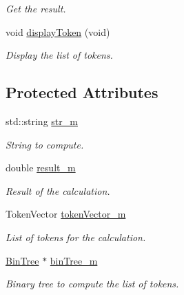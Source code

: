 \begin{DoxyCompactItemize}
\begin{DoxyCompactList}\small\item\em Get the result. \end{DoxyCompactList}\item 
\hypertarget{class_analyze_a9e9e81737e81f2cef3d3d3888370a845}{void \hyperlink{class_analyze_a9e9e81737e81f2cef3d3d3888370a845}{display\-Token} (void)}\label{class_analyze_a9e9e81737e81f2cef3d3d3888370a845}

\begin{DoxyCompactList}\small\item\em Display the list of tokens. \end{DoxyCompactList}\end{DoxyCompactItemize}
\subsection*{Protected Attributes}
\begin{DoxyCompactItemize}
\item 
\hypertarget{class_analyze_a5eaf2648206b44a7136f00f6f2aea716}{std\-::string \hyperlink{class_analyze_a5eaf2648206b44a7136f00f6f2aea716}{str\-\_\-m}}\label{class_analyze_a5eaf2648206b44a7136f00f6f2aea716}

\begin{DoxyCompactList}\small\item\em String to compute. \end{DoxyCompactList}\item 
\hypertarget{class_analyze_ac5e2e04f7a6530205899bfc8089e6a1b}{double \hyperlink{class_analyze_ac5e2e04f7a6530205899bfc8089e6a1b}{result\-\_\-m}}\label{class_analyze_ac5e2e04f7a6530205899bfc8089e6a1b}

\begin{DoxyCompactList}\small\item\em Result of the calculation. \end{DoxyCompactList}\item 
\hypertarget{class_analyze_a0cb9f60bf517b50df90aa9669199f61c}{Token\-Vector \hyperlink{class_analyze_a0cb9f60bf517b50df90aa9669199f61c}{token\-Vector\-\_\-m}}\label{class_analyze_a0cb9f60bf517b50df90aa9669199f61c}

\begin{DoxyCompactList}\small\item\em List of tokens for the calculation. \end{DoxyCompactList}\item 
\hypertarget{class_analyze_a39e0800126b89524cad70e84b5bb3704}{\hyperlink{class_bin_tree}{Bin\-Tree} $\ast$ \hyperlink{class_analyze_a39e0800126b89524cad70e84b5bb3704}{bin\-Tree\-\_\-m}}\label{class_analyze_a39e0800126b89524cad70e84b5bb3704}

\begin{DoxyCompactList}\small\item\em Binary tree to compute the list of tokens. \end{DoxyCompactList}\end{DoxyCompactItemize}


